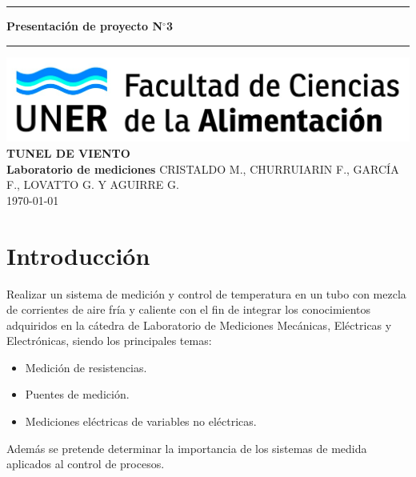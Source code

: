 \documentclass[12pt]{article}
\begin{document}
\begin{titlepage}
\begin{center}
\vspace*{2\baselineskip}
\hrule height 3pt
\vspace*{0.5\baselineskip}
{\Huge \textbf{Presentación de proyecto N$^\circ$3}}
\vspace*{0.5\baselineskip}
\hrule
\vspace*{10\baselineskip}
\includegraphics[scale=0.35]{src/institucion/Logo_fcal-1174x247.png}
\vspace*{2\baselineskip}
\textbf{\\TUNEL DE VIENTO\\}
\textbf{Laboratorio de mediciones}
\vfill
CRISTALDO M., CHURRUIARIN F., GARCÍA F., LOVATTO G. Y AGUIRRE G.\\
\today
\end{center}
\end{titlepage}

\tableofcontents
\thispagestyle{empty}
\newpage

\setcounter{page}{1}

\section{Introducción}
Realizar un sistema de medición y control de temperatura en un tubo con mezcla de corrientes de aire fría y caliente con el fin de integrar los conocimientos adquiridos en la cátedra de Laboratorio de Mediciones Mecánicas, Eléctricas y Electrónicas, siendo los principales temas:

\begin{itemize}
	\item Medición de resistencias.
	\item Puentes de medición.
	\item Mediciones eléctricas de variables no eléctricas.
\end{itemize}

Además se pretende determinar la importancia de los sistemas de medida aplicados al control de procesos. 
\end{document}
